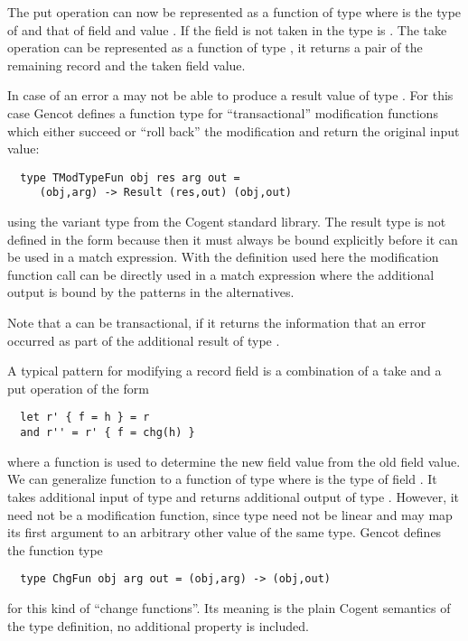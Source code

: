 The put operation can now be represented as a function of type  where  is the type of
 and  that of field  and value . If the field is not taken in  the type is .
The take operation can be represented as a function of type , it returns 
a pair of the remaining record and the taken field value.

In case of an error a  may not be able to produce a result value of type . For this case Gencot defines 
a function type for ``transactional'' modification functions which either succeed or ``roll back'' the modification and return 
the original input value:
\begin{verbatim}
  type TModTypeFun obj res arg out = 
     (obj,arg) -> Result (res,out) (obj,out)
\end{verbatim}
using the variant type  from the Cogent standard library. The result type is not defined in the form 
 because then it must always be bound explicitly before it can be used in a match expression.
With the definition used here the modification function call can be directly used in a match expression where the 
additional output is bound by the patterns in the alternatives.

Note that a  can be transactional, if it
returns the information that an error occurred as part of the additional result of type .

A typical pattern for modifying a record field  is a combination of a take and a put operation of the form
\begin{verbatim}
  let r' { f = h } = r 
  and r'' = r' { f = chg(h) }
\end{verbatim}
where a function  is used to determine the new field value from the old field value. We can generalize function
 to a function of type  where  is the type of field . It takes 
additional input of type  and returns additional output of type . However, it need not be a modification
function, since type  need not be linear and  may map its first argument to an arbitrary other value
of the same type. Gencot defines the function type
\begin{verbatim}
  type ChgFun obj arg out = (obj,arg) -> (obj,out)
\end{verbatim}
for this kind of ``change functions''. Its meaning is the plain Cogent semantics of the type definition, no additional property is 
included.

